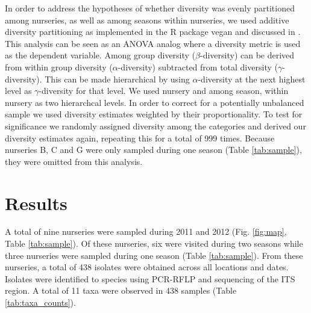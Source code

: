 \documentclass[12pt]{article}
\begin{document}
In order to address the hypotheses of whether diversity was evenly partitioned among nurseries, as well as among seasons within nurseries, we used additive diversity partitioning as implemented in the R package vegan \cite{vegan} and discussed in \cite{lande_1996, christ_etal_2003}.  This analysis can be seen as an ANOVA analog where a diversity metric is used as the dependent variable.  Among group diversity ($\beta$-diversity) can be derived from within group diversity ($\alpha$-diversity) subtracted from total diversity ($\gamma$-diversity).  This can be made hierarchical by using $\alpha$-diversity at the next highest level as $\gamma$-diversity for that level.  We used nursery and among season, within nursery as two hierarchcal levels.  In order to correct for a potentially unbalanced sample we used diversity estimates weighted by their proportionality.  To test for significance we randomly assigned diversity among the categories and derived our diversity estimates again, repeating this for a total of 999 times.  Because nurseries B, C and G  were only sampled during one season (Table \ref{tab:sample}), they were omitted from this analysis.


\section*{\sffamily\normalsize{Results}}

A total of nine nurseries were sampled during 2011 and 2012 (Fig. \ref{fig:map}, Table \ref{tab:sample}).  Of these nurseries, six were visited during two seasons while three nurseries were sampled during one season (Table \ref{tab:sample}).  From these nurseries, a total of 438 isolates were obtained across all locations and dates.  Isolates were identified to species using PCR-RFLP and sequencing of the ITS region. A total of 11 taxa were observed in 438 samples (Table \ref{tab:taxa_counts}).
\end{document}
